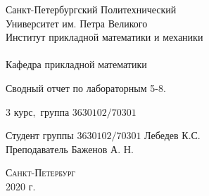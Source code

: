 \documentclass[a4]{article}
\begin{document}
\def\contentsname{\LARGE{Содержание}}
\thispagestyle{empty}
\begin{center} 

\vspace{2cm} 
{\Large \sc Санкт-Петербургский Политехнический}\\
\vspace{2mm}
{\Large \sc Университет} им. {\Large\sc Петра Великого}\\
\vspace{1cm}
{\large \sc Институт прикладной математики и механики\\ 
\vspace{0.5mm}
\textsc{}}\\ 
\vspace{0.5mm}
{\large\sc Кафедра прикладной математики}\\
\vspace{15mm}


{\huge \sc Сводный отчет по лабораторным 5-8.

 }
\vspace*{2mm}


\vspace{1cm}

{\sc $3$ курс$,$ группа $3630102/70301$}

\vspace{2cm} 
Студент группы $3630102/70301$ \hfill Лебедев К.С.\\
\vspace{1cm}
Преподаватель \hfill Баженов А. Н.\\
\vspace{20mm} 

\end{center} 
\begin{center}
\vfill {\large\textsc{Санкт-Петербург}}\\ 
2020 г.
\end{center}

\end{document}
